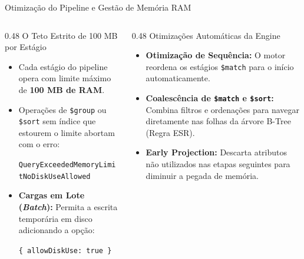 \begin{frame}[fragile]{Otimização do Pipeline e Gestão de Memória RAM}
  \vspace{0.1cm}
  \begin{columns}[t,onlytextwidth]
    \begin{column}{0.48\textwidth}
      \alert{O Teto Estrito de 100 MB por Estágio}\par
      \footnotesize
      \begin{itemize}
        \item Cada estágio do pipeline opera com limite máximo de \textbf{100 MB de RAM}.
        \item Operações de \lstinline[language=mongosh, basicstyle=\footnotesize\ttfamily]|$group| ou \lstinline[language=mongosh, basicstyle=\footnotesize\ttfamily]|$sort| sem índice que estourem o limite abortam com o erro:
          \par\vspace{0.1cm}
          \centering
          \lstinline[language=mongosh, basicstyle=\fontsize{7.2pt}{6pt}\ttfamily]|QueryExceededMemoryLimitNoDiskUseAllowed|
          \par\vspace{0.1cm}
          \raggedright
        \item \textbf{Cargas em Lote (\textit{Batch}):} Permita a escrita temporária em disco adicionando a opção:
          \par\vspace{0.1cm}
          \centering
          \lstinline[language=mongosh, basicstyle=\footnotesize\ttfamily]|{ allowDiskUse: true }|
      \end{itemize}
    \end{column}
    \begin{column}{0.48\textwidth}
      \alert{Otimizações Automáticas da Engine}\par
      \footnotesize
      \begin{itemize}
        \item \textbf{Otimização de Sequência:} O motor reordena os estágios \lstinline[language=mongosh, basicstyle=\footnotesize\ttfamily]|$match| para o início automaticamente.
        \item \textbf{Coalescência de \lstinline[language=mongosh, basicstyle=\footnotesize\ttfamily]|$match| e \lstinline[language=mongosh, basicstyle=\footnotesize\ttfamily]|$sort|:} Combina filtros e ordenações para navegar diretamente nas folhas da árvore B-Tree (Regra ESR).
        \item \textbf{Early Projection:} Descarta atributos não utilizados nas etapas seguintes para diminuir a pegada de memória.
      \end{itemize}
    \end{column}
  \end{columns}
\end{frame}

